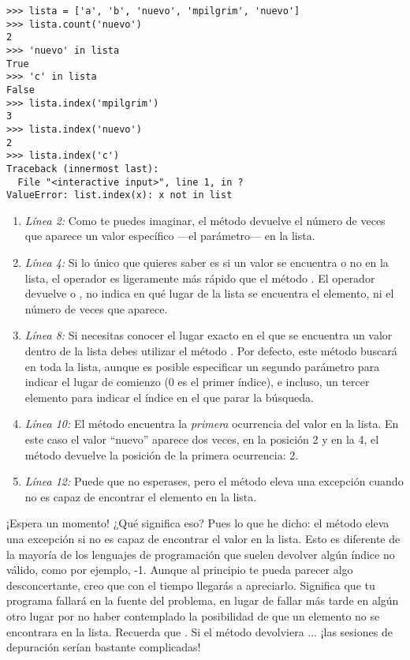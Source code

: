 \noindent\begin{minipage}{\textwidth}
\begin{lstlisting}[mathescape=True]
>>> lista = ['a', 'b', 'nuevo', 'mpilgrim', 'nuevo']
>>> lista.count('nuevo')
2
>>> 'nuevo' in lista
True
>>> 'c' in lista
False
>>> lista.index('mpilgrim')
3
>>> lista.index('nuevo')
2
>>> lista.index('c')
Traceback (innermost last):
  File "<interactive input>", line 1, in ?
ValueError: list.index(x): x not in list
\end{lstlisting}
\end{minipage}

\begin{enumerate}

\item \emph{Línea 2:} Como te puedes imaginar, el método  devuelve el número de veces que aparece un valor específico ---el parámetro--- en la lista.

\item \emph{Línea 4:} Si lo único que quieres saber es si un valor se encuentra o no en la lista, el operador  es ligeramente más rápido que el método . El operador  devuelve  o , no indica en qué lugar de la lista se encuentra el elemento, ni el número de veces que aparece.

\item \emph{Línea 8:} Si necesitas conocer el lugar exacto en el que se encuentra un valor dentro de la lista debes utilizar el método . Por defecto, este método buscará en toda la lista, aunque es posible especificar un segundo parámetro para indicar el lugar de comienzo (0 es el primer índice), e incluso, un tercer elemento para indicar el índice en el que parar la búsqueda.

\item \emph{Línea 10:} El método  encuentra la \emph{primera} ocurrencia del valor en la lista. En este caso el valor ``nuevo'' aparece dos veces, en la posición 2 y en la 4, el método devuelve la posición de la primera ocurrencia: 2.

\item \emph{Línea 12:} Puede que no esperases, pero el método  eleva una excepción  cuando no es capaz de encontrar el elemento en la lista.

\end{enumerate}

¡Espera un momento! ¿Qué significa eso? Pues lo que he dicho: el método  eleva una excepción si no es capaz de encontrar el valor en la lista. Esto es diferente de la mayoría de los lenguajes de programación que suelen devolver algún índice no válido, como por ejemplo, -1. Aunque al principio te pueda parecer algo desconcertante, creo que con el tiempo llegarás a apreciarlo. Significa que tu programa fallará en la fuente del problema, en lugar de fallar más tarde en algún otro lugar por no haber contemplado la posibilidad de que un elemento no se encontrara en la lista. Recuerda que . Si el método  devolviera ... ¡las sesiones de depuración serían bastante complicadas!

